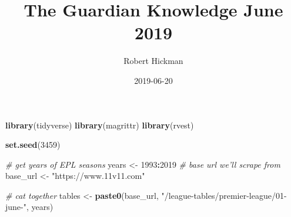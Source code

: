 \documentclass[]{article}
\title{The Guardian Knowledge June 2019}
\author{Robert Hickman}
\date{2019-06-20}
\newenvironment{Shaded}{\begin{snugshade}}{\end{snugshade}}
\newcommand{\CommentTok}[1]{\textcolor[rgb]{0.56,0.35,0.01}{\textit{#1}}}
\newcommand{\DecValTok}[1]{\textcolor[rgb]{0.00,0.00,0.81}{#1}}
\newcommand{\KeywordTok}[1]{\textcolor[rgb]{0.13,0.29,0.53}{\textbf{#1}}}
\newcommand{\NormalTok}[1]{#1}
\newcommand{\OperatorTok}[1]{\textcolor[rgb]{0.81,0.36,0.00}{\textbf{#1}}}
\newcommand{\StringTok}[1]{\textcolor[rgb]{0.31,0.60,0.02}{#1}}
\begin{document}
\maketitle

\begin{Shaded}
\begin{Highlighting}[]
\KeywordTok{library}\NormalTok{(tidyverse)}
\KeywordTok{library}\NormalTok{(magrittr)}
\KeywordTok{library}\NormalTok{(rvest)}

\KeywordTok{set.seed}\NormalTok{(}\DecValTok{3459}\NormalTok{)}
\end{Highlighting}
\end{Shaded}

\begin{Shaded}
\begin{Highlighting}[]
\CommentTok{# get years of EPL seasons}
\NormalTok{years <-}\StringTok{ }\DecValTok{1993}\OperatorTok{:}\DecValTok{2019}
\CommentTok{# base url we'll scrape from}
\NormalTok{base_url <-}\StringTok{ "https://www.11v11.com"}

\CommentTok{# cat together}
\NormalTok{tables <-}\StringTok{ }\KeywordTok{paste0}\NormalTok{(base_url, }\StringTok{"/league-tables/premier-league/01-june-"}\NormalTok{, years)}
\end{Highlighting}
\end{Shaded}
\end{document}
